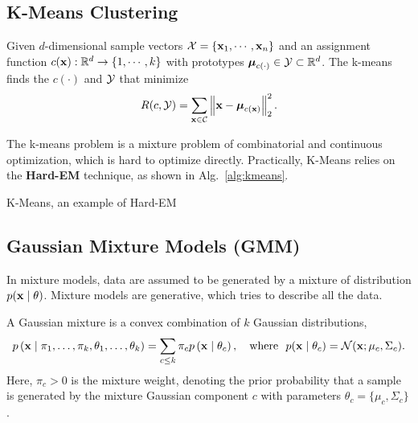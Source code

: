 \subsection{K-Means Clustering}
\begin{definition}
	Given $d$-dimensional sample vectors $\mathcal{X} = \{ \mathbf{x}_1, \cdots, \mathbf{x}_n\}$ and an assignment function $c(\mathbf{x}): \mathbb{R}^d \rightarrow \{1, \cdots, k\}$ with prototypes $\boldsymbol{\mu}_{c(\cdot)} \in \mathcal{Y} \subset \mathbb{R}^d$. The k-means finds the $c(\cdot)$ and $\mathcal{Y}$ that minimize 
	$$
	R(c, \mathcal{Y}) = \sum_{\mathbf{x} \in \mathcal{C}} \left\lVert \mathbf{x} - \boldsymbol{\mu}_{c(\mathbf{x})} \right\rVert^2_2.
	$$
\end{definition}
The k-means problem is a mixture problem of combinatorial and continuous optimization, which is hard to optimize directly. Practically, K-Means relies on the \textbf{Hard-EM} technique, as shown in Alg.~\ref{alg:kmeans}.

\begin{algorithm}[H]
 \caption{K-Means, an example of Hard-EM \label{alg:kmeans}}
\SetAlgoLined
 
\end{algorithm}

\subsection{Gaussian Mixture Models (GMM)}
In mixture models, data are assumed to be generated by a mixture of distribution $p(\mathbf{x} \mid \theta)$. Mixture models are generative, which tries to describe all the data. 
\begin{definition}[GMM]
	A Gaussian mixture is a convex combination of $k$ Gaussian distributions,
	$$
p\left(\mathbf{x} \mid \pi_{1}, \ldots, \pi_{k}, {\theta}_{1}, \ldots, {\theta}_{k}\right)=\sum_{c \leq k} \pi_{c} p\left(\mathbf{x} \mid {\theta}_{c}\right), \quad \text{where}\ \  p(\mathbf{x} \mid \theta_c) = \mathcal{N}(\mathbf{x}; \mu_c, \Sigma_c).
$$
Here, $\pi_c > 0$ is the mixture weight, denoting the prior probability that a sample is generated by the mixture Gaussian component $c$ with parameters $\theta_c = \{\mu_c, \Sigma_c \}$.
\end{definition}

